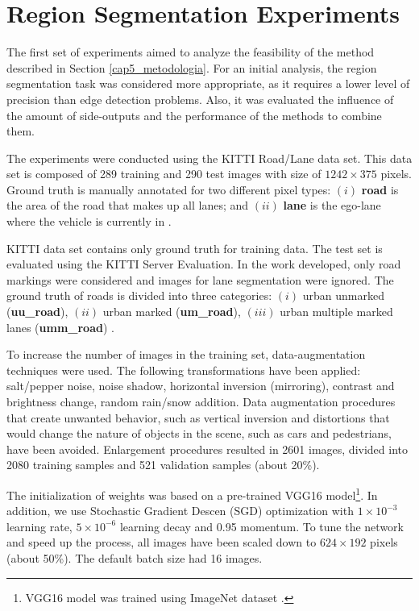 \section{Region Segmentation Experiments}
\label{cap6_result_experm_1}

The first set of experiments aimed to analyze the feasibility of the method described in Section \ref{cap5_metodologia}.
For an initial analysis, the region segmentation task was considered more appropriate, as it requires a lower level of precision than edge detection problems.
Also, it was evaluated the influence of the amount of side-outputs and the performance of the methods to combine them.

The experiments were conducted using the KITTI Road/Lane data set.
This data set is composed of 289 training and 290 test images with size of $1242 \times 375$ pixels. 
Ground truth is manually annotated for two different pixel types: $(i)$ \textbf{road} is the area of the road that makes up all lanes; and $(ii)$ \textbf{lane} is the ego-lane where the vehicle is currently in \cite{Fritsch2013ITSC}.

KITTI data set contains only ground truth for training data.
The test set is evaluated using the KITTI Server Evaluation.
In the work developed, only road markings were considered and images for lane segmentation were ignored.
The ground truth of roads is divided into three categories: $(i)$ urban unmarked (\textbf{uu\_road}), $(ii)$ urban marked (\textbf{um\_road}), $(iii)$ urban multiple marked lanes (\textbf{umm\_road}) \cite{Fritsch2013ITSC}.

To increase the number of images in the training set, data-augmentation techniques were used.
The following transformations have been applied: salt/pepper noise, noise shadow, horizontal inversion (mirroring), contrast and brightness change, random rain/snow addition.
Data augmentation procedures that create unwanted behavior, such as vertical inversion and distortions that would change the nature of objects in the scene, such as cars and pedestrians, have been avoided.
Enlargement procedures resulted in 2601 images, divided into 2080 training samples and 521 validation samples (about 20\%).

The initialization of weights was based on a pre-trained VGG16 model\footnote{VGG16 model was trained using ImageNet dataset \cite{ILSVRC15}.}.
In addition, we use Stochastic Gradient Descen (SGD) optimization with $1 \times 10^{-3}$ learning rate, $5 \times 10^{-6}$ learning decay and 0.95 momentum.
To tune the network and speed up the process, all images have been scaled down to $624 \times 192$ pixels (about 50\%). 
The default batch size had 16 images.

